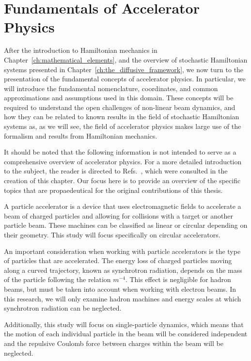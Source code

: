 
\chapter{Fundamentals of Accelerator Physics}\label{ch:accelerator_physics_fundamentals}

After the introduction to Hamiltonian mechanics in Chapter~\ref{ch:mathematical_elements}, and the overview of stochastic Hamiltonian systems presented in Chapter~\ref{ch:the_diffusive_framework}, we now turn to the presentation of the fundamental concepts of accelerator physics. In particular, we will introduce the fundamental nomenclature, coordinates, and common approximations and assumptions used in this domain. These concepts will be required to understand the open challenges of non-linear beam dynamics, and how they can be related to known results in the field of stochastic Hamiltonian systems as, as we will see, the field of accelerator physics makes large use of the formalism and results from Hamiltonian mechanics.

It should be noted that the following information is not intended to serve as a comprehensive overview of accelerator physics. For a more detailed introduction to the subject, the reader is directed to Refs.~\cite{Lee:2651939,wiedemann2015particle}, which were consulted in the creation of this chapter. Our focus here is to provide an overview of the specific topics that are propaedeutical for the original contributions of this thesis. 

A particle accelerator is a device that uses electromagnetic fields to accelerate a beam of charged particles and allowing for collisions with a target or another particle beam. These machines can be classified as linear or circular depending on their geometry. This study will focus specifically on circular accelerators.

An important consideration when working with particle accelerators is the type of particles that are accelerated. The energy loss of charged particles moving along a curved trajectory, known as synchrotron radiation, depends on the mass of the particle following the relation $m^{-4}$. This effect is negligible for hadron beams, but must be taken into account when working with electron beams. In this research, we will only examine hadron machines and energy scales at which synchrotron radiation can be neglected.

Additionally, this study will focus on single-particle dynamics, which means that the motion of each individual particle in the beam will be considered independent and the repulsive Coulomb force between charges within the beam will be neglected. 


